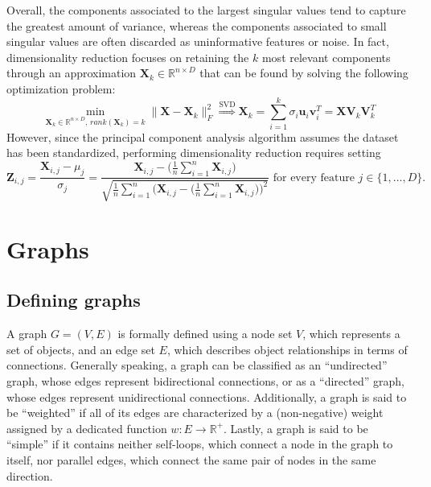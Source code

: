 \documentclass{report}
\begin{document}
\noindent Overall, the components associated to the largest singular values tend to capture the greatest amount of variance, whereas the components associated to small singular values are often discarded as uninformative features or noise. \newline
In fact, dimensionality reduction focuses on retaining the $\displaystyle k$ most relevant components through an approximation $\displaystyle \mathbf{X}_k \in \mathbb{R}^{n \times D}$ that can be found by solving the following optimization problem:
\[\min_{\mathbf{X}_k \in \mathbb{R}^{n \times D} \text{, } rank(\mathbf{X}_k) = k} \lVert \mathbf{X} - \mathbf{X}_k \rVert_F^2 \stackrel{\text{SVD}}{\Rightarrow} \mathbf{X}_k = \sum_{i = 1}^k \sigma_i\mathbf{u}_i\mathbf{v}_i^T = \mathbf{XV}_k\mathbf{V}_k^T\]
However, since the principal component analysis algorithm assumes the dataset has been standardized, performing dimensionality reduction requires setting
\[\mathbf{Z}_{i, j} = \frac{\mathbf{X}_{i, j} - \mu_j}{\sigma_j} = \frac{\mathbf{X}_{i, j} - \big(\frac{1}{n}\sum_{i = 1}^n \mathbf{X}_{i, j}\big)}{\sqrt{\frac{1}{n}\sum_{i = 1}^n \big(\mathbf{X}_{i, j} - \big(\frac{1}{n}\sum_{i = 1}^n \mathbf{X}_{i, j}\big)\big)^2}} \text{ for every feature $j \in \{1, \dots, D\}$.}\]

\chapter{Graphs}
\section{Defining graphs}
A graph $\displaystyle G = (V, E)$ is formally defined using a node set $\displaystyle V$, which represents a set of objects, and an edge set $\displaystyle E$, which describes object relationships in terms of connections. \newline
Generally speaking, a graph can be classified as an ``undirected'' graph, whose edges represent bidirectional connections, or as a ``directed'' graph, whose edges represent unidirectional connections. \newline
Additionally, a graph is said to be ``weighted'' if all of its edges are characterized by a (non-negative) weight assigned by a dedicated function $\displaystyle w: E \to \mathbb{R}^+$. \newline
Lastly, a graph is said to be ``simple'' if it contains neither self-loops, which connect a node in the graph to itself, nor parallel edges, which connect the same pair of nodes in the same direction.
\end{document}
